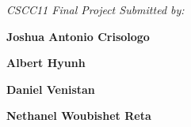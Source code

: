 \begin{titlepage}
\centering
\vspace*{0.6in}

{\fontsize{18}{18}\selectfont \textbf{\MakeUppercase{\reporttitle}} \par}
\vspace{0.55in}

{\fontsize{13}{13}\selectfont \textit{CSCC11 Final Project Submitted by:} \par}
\vspace{0.25in}

{\fontsize{15}{15}\selectfont \textbf{Joshua Antonio Crisologo} \par}
\vspace{0.08in}
{\fontsize{15}{15}\selectfont \textbf{Albert Hyunh} \par}
\vspace{0.08in}
{\fontsize{15}{15}\selectfont \textbf{Daniel Venistan} \par}
\vspace{0.08in}
{\fontsize{15}{15}\selectfont \textbf{Nethanel Woubishet Reta} \par}
\vspace{0.55in}

\end{titlepage}
\newpage
